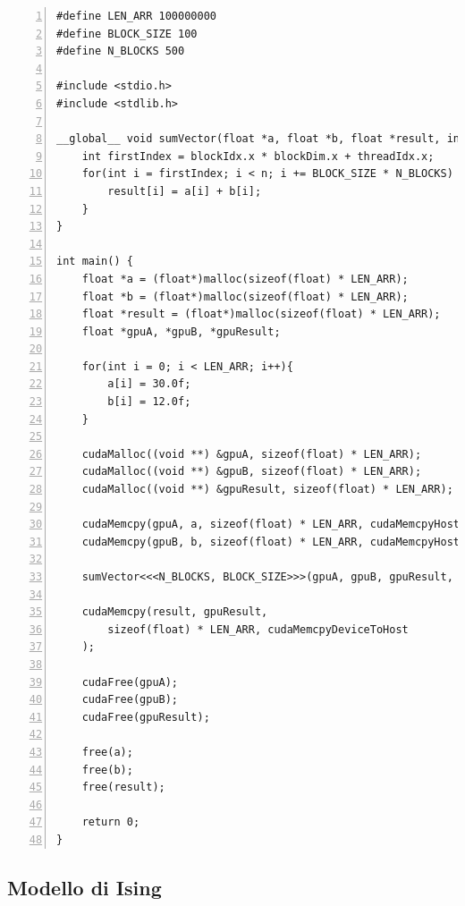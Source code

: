 \documentclass[a4paper,11pt]{article}
\begin{document}
\begin{Verbatim}[numbers=left, frame=single]
#define LEN_ARR 100000000
#define BLOCK_SIZE 100
#define N_BLOCKS 500

#include <stdio.h>
#include <stdlib.h>

__global__ void sumVector(float *a, float *b, float *result, int n) {
    int firstIndex = blockIdx.x * blockDim.x + threadIdx.x;
    for(int i = firstIndex; i < n; i += BLOCK_SIZE * N_BLOCKS) {
        result[i] = a[i] + b[i];
    }
}

int main() {
    float *a = (float*)malloc(sizeof(float) * LEN_ARR);
    float *b = (float*)malloc(sizeof(float) * LEN_ARR);
    float *result = (float*)malloc(sizeof(float) * LEN_ARR);
    float *gpuA, *gpuB, *gpuResult;

    for(int i = 0; i < LEN_ARR; i++){
        a[i] = 30.0f;
        b[i] = 12.0f;
    }

    cudaMalloc((void **) &gpuA, sizeof(float) * LEN_ARR);
    cudaMalloc((void **) &gpuB, sizeof(float) * LEN_ARR);
    cudaMalloc((void **) &gpuResult, sizeof(float) * LEN_ARR);

    cudaMemcpy(gpuA, a, sizeof(float) * LEN_ARR, cudaMemcpyHostToDevice);
    cudaMemcpy(gpuB, b, sizeof(float) * LEN_ARR, cudaMemcpyHostToDevice);

    sumVector<<<N_BLOCKS, BLOCK_SIZE>>>(gpuA, gpuB, gpuResult, LEN_ARR);

    cudaMemcpy(result, gpuResult,
        sizeof(float) * LEN_ARR, cudaMemcpyDeviceToHost
    );

    cudaFree(gpuA);
    cudaFree(gpuB);
    cudaFree(gpuResult);

    free(a); 
    free(b); 
    free(result);

    return 0;
}
\end{Verbatim}

\subsection{Modello di Ising}
\end{document}
